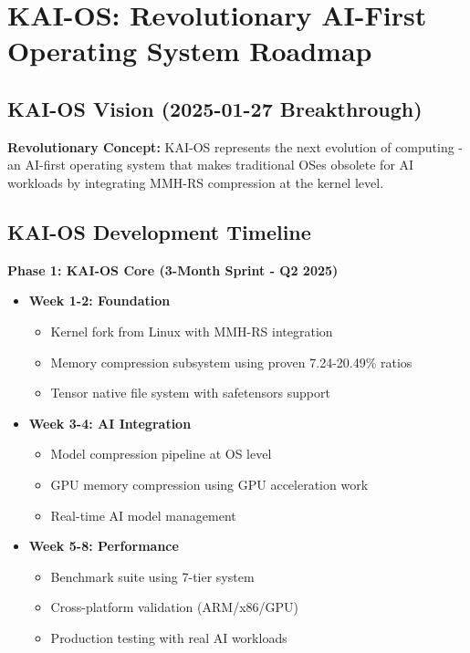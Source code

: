 \documentclass[12pt,a4paper]{article}
\begin{document}
\section{KAI-OS: Revolutionary AI-First Operating System Roadmap}

\subsection{KAI-OS Vision (2025-01-27 Breakthrough)}

\textbf{Revolutionary Concept:} KAI-OS represents the next evolution of computing - an AI-first operating system that makes traditional OSes obsolete for AI workloads by integrating MMH-RS compression at the kernel level.

\subsection{KAI-OS Development Timeline}

\textbf{Phase 1: KAI-OS Core (3-Month Sprint - Q2 2025)}
\begin{itemize}
    \item \textbf{Week 1-2: Foundation}
    \begin{itemize}
        \item Kernel fork from Linux with MMH-RS integration
        \item Memory compression subsystem using proven 7.24-20.49\% ratios
        \item Tensor native file system with safetensors support
    \end{itemize}
    \item \textbf{Week 3-4: AI Integration}
    \begin{itemize}
        \item Model compression pipeline at OS level
        \item GPU memory compression using GPU acceleration work
        \item Real-time AI model management
    \end{itemize}
    \item \textbf{Week 5-8: Performance}
    \begin{itemize}
        \item Benchmark suite using 7-tier system
        \item Cross-platform validation (ARM/x86/GPU)
        \item Production testing with real AI workloads
    \end{itemize}
\end{itemize}
\end{document}
